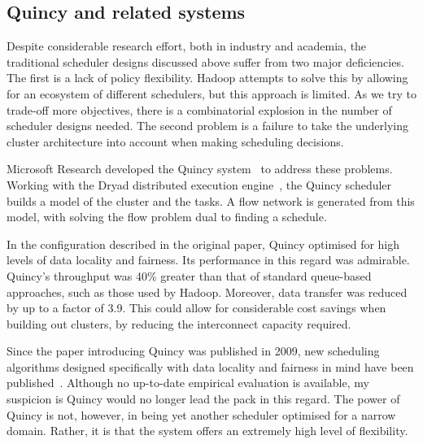 \subsection{Quincy and related systems} \label{sec:prep-scheduling-quincy}

Despite considerable research effort, both in industry and academia, the traditional scheduler designs discussed above suffer from two major deficiencies. The first is a lack of policy flexibility. Hadoop attempts to solve this by allowing for an ecosystem of different schedulers, but this approach is limited. As we try to trade-off more objectives, there is a combinatorial explosion in the number of scheduler designs needed. The second problem is a failure to take the underlying cluster architecture into account when making scheduling decisions.


Microsoft Research developed the Quincy system~\cite{Isard:2009} to address these problems. Working with the Dryad distributed execution engine~\cite{Isard:2007}\footnotemark, the Quincy scheduler builds a model of the cluster and the tasks. A flow network is generated from this model, with solving the flow problem dual to finding a schedule.

In the configuration described in the original paper, Quincy optimised for high levels of data locality and fairness. Its performance in this regard was admirable. Quincy's throughput was 40\% greater than that of standard queue-based approaches, such as those used by Hadoop. Moreover, data transfer was reduced by up to a factor of 3.9. This could allow for considerable cost savings when building out clusters, by reducing the interconnect capacity required.

Since the paper introducing Quincy was published in 2009, new scheduling algorithms designed specifically with data locality and fairness in mind have been published~\cite{Guo:2012,Jin:2011,Ibrahim:2010}. Although no up-to-date empirical evaluation is available, my suspicion is Quincy would no longer lead the pack in this regard. The power of Quincy is not, however, in being yet another scheduler optimised for a narrow domain. Rather, it is that the system offers an extremely high level of flexibility.

